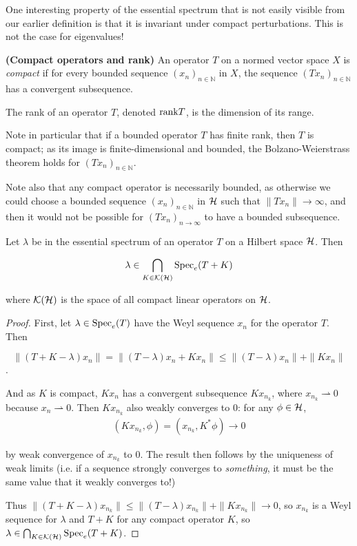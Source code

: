 \documentclass[../main.tex]{subfiles}
\begin{document}
One interesting property of the essential spectrum that is not easily visible from our earlier definition is that it is invariant under compact
perturbations. This is not the case for eigenvalues!

\begin{definition}{\textbf{(Compact operators and rank)}}
An operator $T$ on a normed vector space $X$ is \emph{compact} if for every bounded sequence $(x_n)_{n \in \mathbb{N}}$ in $X$, the sequence $(Tx_n)_{n \in \mathbb{N}}$ has a convergent subsequence.

The rank of an operator $T$, denoted $\mathrm{rank} T$, is the dimension of its range.
\end{definition}

Note in particular that if a bounded operator $T$ has finite rank, then $T$ is compact; as its image is finite-dimensional and bounded, 
the Bolzano-Weierstrass theorem holds for $(Tx_n)_{n \in \mathbb{N}}$.

Note also that any compact operator is necessarily bounded, as otherwise we could choose a bounded sequence $(x_n)_{n \in \mathbb{N}}$ in $\mathcal{H}$ such that $\|Tx_n\| \rightarrow \infty$, 
and then it would not be possible for $(Tx_n)_{n \rightarrow \infty}$ to have a bounded subsequence. 

\begin{theorem}
Let $\lambda$ be in the essential spectrum of an operator $T$ on a Hilbert space $\mathcal{H}$. Then

\begin{equation}\label{eqn:weyl_spectrum}
\lambda \in \bigcap_{K \in \mathcal{K}(\mathcal{H})} \mathrm{Spec}_e(T + K)
\end{equation}

where $\mathcal{K}(\mathcal{H})$ is the space of all compact linear operators on $\mathcal{H}$.
\end{theorem}
\begin{proof}
First, let $\lambda \in \mathrm{Spec}_e(T)$ have the Weyl sequence $x_n$ for the operator $T$. Then 

$$\|(T+K-\lambda)x_n\| = \|(T - \lambda)x_n+Kx_n\| \leq \|(T - \lambda)x_n\| + \|Kx_n\|$$. 

And as $K$ is compact, $Kx_n$ has a convergent subsequence $Kx_{n_k}$, where $x_{n_k} \rightharpoonup 0$ because $x_n \rightharpoonup 0$.
Then $Kx_{n_k}$ also weakly converges to 0: for any $\phi \in \mathcal{H}$,
\begin{align*}
(Kx_{n_k}, \phi) = (x_{n_k}, K^* \phi) \rightarrow 0
\end{align*}

by weak convergence of $x_{n_k}$ to 0. The result then follows by the uniqueness of weak limits (i.e. if a sequence strongly converges to \emph{something}, it must be the same value that it weakly converges to!)

Thus $\|(T+K-\lambda)x_{n_k}\| \leq \|(T - \lambda)x_{n_k}\| + \|Kx_{n_k}\| \rightarrow 0$, so $x_{n_k}$ is a Weyl sequence for $\lambda$ and $T+K$ 
for any compact operator $K$, so $\lambda \in \bigcap_{K \in \mathcal{K}(\mathcal{H})} \mathrm{Spec}_e(T + K)$.
\end{proof}
\end{document}
